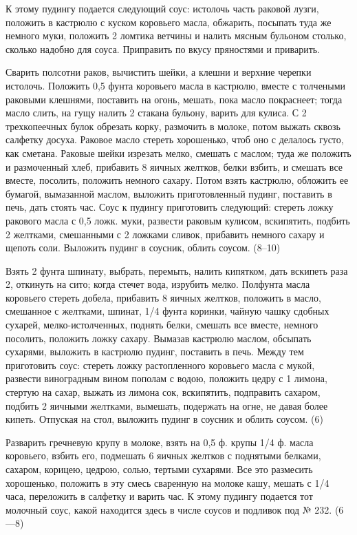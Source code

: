 К этому пудингу подается следующий соус: истолочь часть раковой лузги, положить в кастрюлю с куском коровьего масла, обжарить, посыпать туда же немного муки, положить 2 ломтика ветчины и налить мясным бульоном столько, сколько надобно для соуса. Приправить по вкусу пряностями и приварить. 


Сварить полсотни раков, вычистить шейки, а клешни и верхние черепки истолочь. Положить 0,5 фунта коровьего масла в кастрюлю, вместе с толчеными раковыми клешнями, поставить на огонь, мешать, пока масло покраснеет; тогда масло слить, на гущу налить 2 стакана бульону, варить для кулиса. С 2 трехкопеечных булок обрезать корку, размочить в молоке, потом выжать сквозь салфетку досуха. Раковое масло стереть хорошенько, чтоб оно с делалось густо, как сметана. Раковые шейки изрезать мелко, смешать с маслом; туда же положить и размоченный хлеб, прибавить 8 яичных желтков, белки взбить, и смешать все вместе, посолить, положить немного сахару. Потом взять кастрюлю, обложить ее бумагой, вымазанной маслом, выложить приготовленный пудинг, поставить в печь, дать стоять час. Соус к пудингу приготовить следующий: стереть ложку ракового масла с 0,5 ложк. муки, развести раковым кулисом, вскипятить, подбить 2 желтками, смешанными с 2 ложками сливок, прибавить немного сахару и щепоть соли. Выложить пудинг в соусник, облить соусом. (8--10) 


Взять 2 фунта шпинату, выбрать, перемыть, налить кипятком, дать вскипеть раза 2, откинуть на сито; когда стечет вода, изрубить мелко. Полфунта масла коровьего стереть добела, прибавить 8 яичных желтков, положить в масло, смешанное с желтками, шпинат, 1/4 фунта коринки, чайную чашку сдобных сухарей, мелко-истолченных, поднять белки, смешать все вместе, немного посолить, положить ложку сахару. Вымазав кастрюлю маслом, обсыпать сухарями, выложить в кастрюлю пудинг, поставить в печь. Между тем приготовить соус: стереть ложку растопленного коровьего масла с мукой, развести виноградным вином пополам с водою, положить цедру с 1 лимона, стертую на сахар, выжать из лимона сок, вскипятить, подправить сахаром, подбить 2 яичными желтками, вымешать, подержать на огне, не давая более кипеть. Отпуская на стол, выложить пудинг в соусник и облить соусом. (6) 


Разварить гречневую крупу в молоке, взять на 0,5 ф. крупы 1/4 ф. масла коровьего, взбить его, подмешать 6 яичных желтков с поднятыми белками, сахаром, корицею, цедрою, солью, тертыми сухарями. Все это размесить хорошенько, положить в эту смесь сваренную на молоке кашу, мешать с 1/4 часа, переложить в салфетку и варить час. К этому пудингу подается тот молочный соус, какой находится здесь в числе соусов и подливок под № 232. (6—8) 

